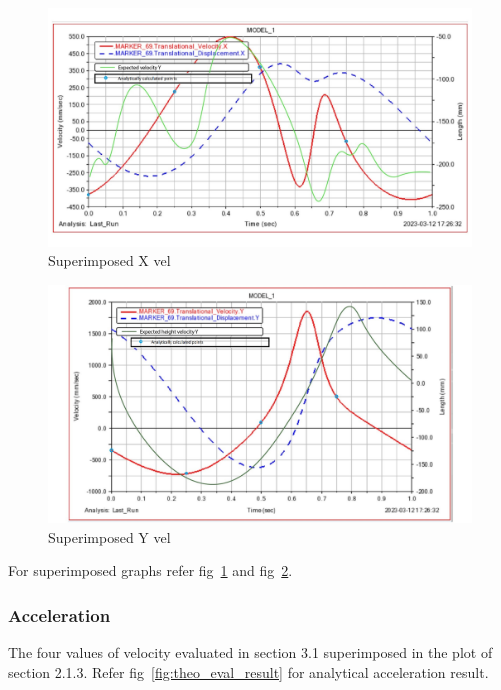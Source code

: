             \begin{figure}[hbt!]
                \centering
                \includegraphics[width=0.9\columnwidth]{Images/anal_x_vel.jpg}
                \caption{Superimposed X vel}
                \label{fig:anal_x_vel}
            \end{figure}

            \begin{figure}[hbt!]
                \centering
                \includegraphics[width=0.9\columnwidth]{Images/anal_height_velocity.jpg}
                \caption{Superimposed Y vel}
                \label{fig:anal_y_vel}
            \end{figure}

            For superimposed graphs refer fig~\ref{fig:anal_x_vel} and fig~\ref{fig:anal_y_vel}.

        \subsubsection{Acceleration}
            The four values of velocity evaluated in section 3.1 superimposed in the plot of section 2.1.3. Refer fig~\ref{fig:theo_eval_result} for analytical acceleration result.


